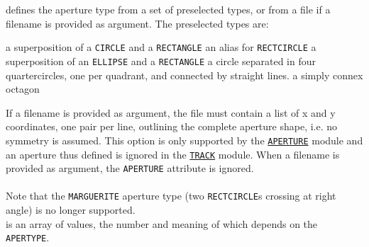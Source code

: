 \begin{5.02.04}
\begin{madlist}
   defines the aperture type from a set of
  preselected types, or from a file if a filename is provided as argument.
  The preselected types are:
    \begin{madlist}
       a superposition of a {\tt CIRCLE} and
        a {\tt RECTANGLE} 
       an alias for {\tt RECTCIRCLE}
       a superposition of an {\tt ELLIPSE} and a
        {\tt RECTANGLE}
       a circle separated in four
      quartercircles, one per quadrant, and connected by straight lines.
       a simply connex octagon
    \end{madlist}
    If a filename is provided as argument, the file must contain a 
    list of x and y coordinates, one pair per line, outlining the complete aperture shape, 
    i.e. no symmetry is assumed. This option is only supported by the 
    \hyperref[chap:aperture]{\tt APERTURE} module and an aperture thus defined is 
    ignored in the \hyperref[chap:thintrack]{\tt TRACK} module.
    When a filename is provided as argument, the {\tt APERTURE} attribute is ignored.\\
\\
Note that the {\tt MARGUERITE} aperture type (two {\tt RECTCIRCLE}s 
crossing at right angle) is no longer supported. 
\\
   is an array of values, the number and meaning 
of which depends on the {\tt APERTYPE}.  
\end{madlist}


\end{5.02.04}
